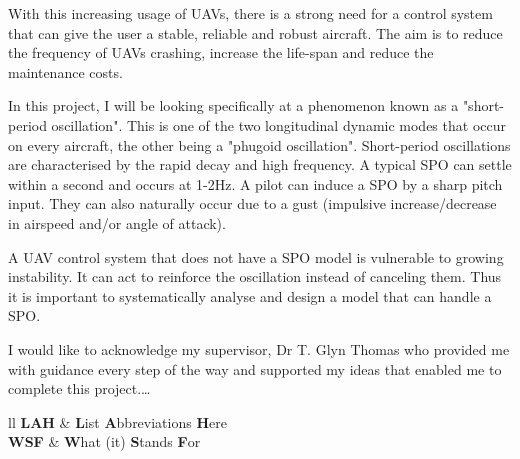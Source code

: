 \documentclass[
11pt, %
english, %
singlespacing, %
headsepline, %
] %
{MastersDoctoralThesis}
\begin{document}
With this increasing usage of UAVs, there is a strong need for a control system that can give the user a stable, reliable and robust aircraft. The aim is to reduce the frequency of UAVs crashing, increase the life-span and reduce the maintenance costs. 

In this project, I will be looking specifically at a phenomenon known as a "short-period oscillation". This is one of the two longitudinal dynamic modes that occur on every aircraft, the other being a "phugoid oscillation". Short-period oscillations are characterised by the rapid decay and high frequency. A typical SPO can settle within a second and occurs at 1-2Hz. A pilot can induce a SPO by a sharp pitch input. They can also naturally occur due to a gust (impulsive increase/decrease in airspeed and/or angle of attack). 

A UAV control system that does not have a SPO model is vulnerable to growing instability. It can act to reinforce the oscillation instead of canceling them. Thus it is important to systematically analyse and design a model that can handle a SPO.  
\newpage
\begingroup
\let\clearpage\relax
\let\cleardoublepage\relax
\begin{acknowledgements}
\thispagestyle{fancy}
I would like to acknowledge my supervisor, Dr T. Glyn Thomas who provided me with guidance every step of the way and supported my ideas that enabled me to complete this project.\ldots

\end{acknowledgements}
\endgroup
\newpage
\begingroup
\let\clearpage\relax
\let\cleardoublepage\relax
\begin{abbreviations}{ll} %
\thispagestyle{fancy}
\textbf{LAH} & \textbf{L}ist \textbf{A}bbreviations \textbf{H}ere\\
\textbf{WSF} & \textbf{W}hat (it) \textbf{S}tands \textbf{F}or\\

\end{abbreviations}
\endgroup
\newpage
\end{document}
